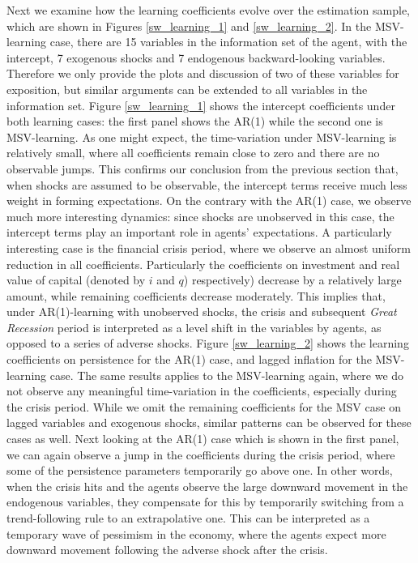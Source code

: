 \documentclass[12pt,reqno]{article}
\numberwithin{equation}{section}
\begin{document}
\noindent
Next we examine how the learning coefficients evolve over the estimation sample, which are shown in Figures \ref{sw_learning_1} and \ref{sw_learning_2}. In the MSV-learning case, there are 15 variables in the information set of the agent, with the intercept, 7 exogenous shocks and 7 endogenous backward-looking variables. Therefore we only provide the plots and discussion of two of these variables for exposition, but similar arguments can be extended to all variables in the information set. Figure \ref{sw_learning_1} shows the intercept coefficients under both learning cases: the first panel shows the AR(1) while the second one is MSV-learning. As one might expect, the time-variation under MSV-learning is relatively small, where all coefficients remain close to zero and there are no observable jumps. This confirms our conclusion from the previous section that, when shocks are assumed to be observable, the intercept terms receive much less weight in forming expectations. On the contrary with the AR(1) case, we observe much more interesting dynamics: since shocks are unobserved in this case, the intercept terms play an important role in agents’ expectations. A particularly interesting case is the financial crisis period, where we observe an almost uniform reduction in all coefficients. Particularly the coefficients on investment and real value of capital (denoted by $i$ and $q$) respectively) decrease by a relatively large amount, while remaining coefficients decrease moderately. This implies that, under AR(1)-learning with unobserved shocks, the crisis and subsequent \textit{Great Recession} period is interpreted as a level shift in the variables by agents, as opposed to a series of adverse shocks. Figure \ref{sw_learning_2} shows the learning coefficients on persistence for the AR(1) case, and lagged inflation for the MSV-learning case. The same results applies to the MSV-learning again, where we do not observe any meaningful time-variation in the coefficients, especially during the crisis period. While we omit the remaining coefficients for the MSV case on lagged variables and exogenous shocks, similar patterns can be observed for these cases as well. Next looking at the AR(1) case which is shown in the first panel, we can again observe a jump in the coefficients during the crisis period, where some of the persistence parameters temporarily go above one. In other words, when the crisis hits and the agents observe the large downward movement in the endogenous variables, they compensate for this by temporarily switching from a trend-following rule to an extrapolative one. This can be interpreted as a temporary wave of pessimism in the economy, where the agents expect more downward movement following the adverse shock after the crisis. \\
\end{document}

